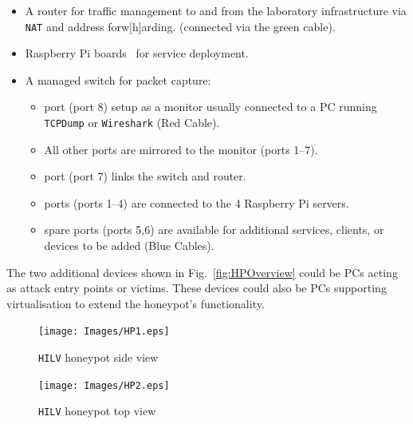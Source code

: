 \documentclass[10pt,journal]{IEEEtran}
\begin{document}
\begin{itemize}
    \item \noindent A router for traffic management to and from the laboratory
      infrastructure via \texttt{NAT} and address forw[h]arding. (connected via the
      green cable). 
    \item {} Raspberry Pi boards~\cite{RASP:17} for service deployment.
    \item \noindent A managed switch for packet capture:
    \begin{itemize}
        \item {} port (port 8) setup as a monitor usually connected to
          a PC running \texttt{TCPDump} or \texttt{Wireshark} (Red Cable).
        \item \noindent All other ports are mirrored to the monitor (ports
          1--7).
        \item {} port (port 7) links the switch and router.
        \item {} ports (ports 1--4) are connected to the 4 Raspberry Pi 
        servers.
        \item {} spare ports (ports 5,6) are available for additional
          services, clients, or devices to be added (Blue Cables).
    \end{itemize}
\end{itemize}

The two additional devices shown in Fig.~\ref{fig:HPOverview} could be PCs
acting as attack entry points or victims. These devices could also be PCs
supporting virtualisation to extend the honeypot's functionality.

\begin{figure}[ht]
  \centering
  \begin{minipage}[ht]{0.45\textwidth}
    \texttt{[image: Images/HP1.eps]}
    \caption{\texttt{HILV} honeypot side view\label{fig:HP1}}
  \end{minipage}
  \hfill
  \begin{minipage}[ht]{0.45\textwidth}
    \texttt{[image: Images/HP2.eps]}
    \caption{\texttt{HILV} honeypot top view\label{fig:HP2}}
  \end{minipage}
\end{figure}

\end{document}
